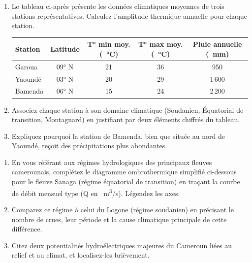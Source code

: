 \documentclass[11pt]{article}
\begin{document}
\begin{exercice}
\begin{enumerate}
    \item Le tableau ci-après présente les données climatiques moyennes de trois stations représentatives. Calculez l'amplitude thermique annuelle pour chaque station.
    \begin{tabular}{|l|c|c|c|c|}
    \hline
    \textbf{Station} & \textbf{Latitude} & \textbf{T° min moy. (\SI{}{\celsius})} & \textbf{T° max moy. (\SI{}{\celsius})} & \textbf{Pluie annuelle (\SI{}{mm})} \\
    \hline
    Garoua & 09° N & 21 & 36 & 950 \\
    Yaoundé & 03° N & 20 & 29 & 1\,600 \\
    Bamenda & 06° N & 15 & 24 & 2\,200 \\
    \hline
    \end{tabular}
    \item Associez chaque station à son domaine climatique (Soudanien, Équatorial de transition, Montagnard) en justifiant par deux éléments chiffrés du tableau.
    \item Expliquez pourquoi la station de Bamenda, bien que située au nord de Yaoundé, reçoit des précipitations plus abondantes.
\end{enumerate}
\end{exercice}

\begin{exercice}
\begin{enumerate}
    \item En vous référant aux régimes hydrologiques des principaux fleuves camerounais, complétez le diagramme ombrothermique simplifié ci-dessous pour le fleuve Sanaga (régime équatorial de transition) en traçant la courbe de débit mensuel type (Q en \SI{}{m^3/s}). Légendez les axes.
    \begin{center}
    \end{center}
    \item Comparez ce régime à celui du Logone (régime soudanien) en précisant le nombre de crues, leur période et la cause climatique principale de cette différence.
    \item Citez deux potentialités hydroélectriques majeures du Cameroun liées au relief et au climat, et localisez-les brièvement.
\end{enumerate}
\end{exercice}
\end{document}
